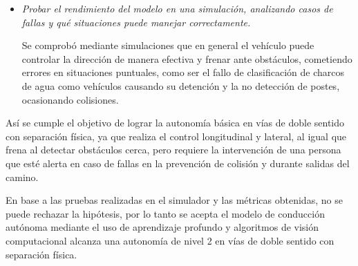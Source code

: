 \begin{itemize}
	\item \textit{Probar el rendimiento del modelo en una simulación, analizando casos de fallas y qué situaciones puede manejar correctamente.}
	

	Se comprobó mediante simulaciones que en general el vehículo puede controlar la dirección de manera efectiva y frenar ante obstáculos, cometiendo errores en situaciones puntuales, como ser el fallo de clasificación de charcos de agua como vehículos causando su detención y la no detección de postes, ocasionando colisiones.
	
\end{itemize}

Así se cumple el objetivo de lograr la autonomía básica en vías de doble sentido con separación física, ya que realiza el control longitudinal y lateral, al igual que frena al detectar obstáculos cerca, pero requiere la intervención de una persona que esté alerta en caso de fallas en la prevención de colisión y durante salidas del camino.

En base a las pruebas realizadas en el simulador y las métricas obtenidas, no se puede rechazar la hipótesis, por lo tanto se acepta el modelo de conducción autónoma mediante el uso de aprendizaje profundo y algoritmos de visión computacional alcanza una autonomía de nivel 2 en vías de doble sentido con separación física.